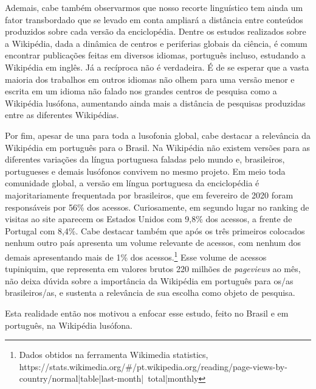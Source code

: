 Ademais, cabe também observarmos que nosso recorte linguístico tem ainda um fator transbordado que se levado em conta ampliará a distância entre conteúdos produzidos sobre cada versão da enciclopédia. Dentre os estudos realizados sobre a Wikipédia, dada a dinâmica de centros e periferias globais da ciência, é comum encontrar publicações feitas em diversos idiomas, português incluso, estudando a Wikipédia em inglês. Já a recíproca não é verdadeira. É de se esperar que a vasta maioria dos trabalhos em outros idiomas não olhem para uma versão menor e escrita em um idioma não falado nos grandes centros de pesquisa como a Wikipédia lusófona, aumentando ainda mais a distância de pesquisas produzidas entre as diferentes Wikipédias.

Por fim, apesar de una para toda a lusofonia global, cabe destacar a relevância da Wikipédia em português para o Brasil. Na Wikipédia não existem versões para as diferentes variações da língua portuguesa faladas pelo mundo e, brasileiros, portugueses e demais lusófonos convivem no mesmo projeto. Em meio toda comunidade global, a versão em língua portuguesa da enciclopédia é majoritariamente frequentada por brasileiros, que em fevereiro de 2020 foram responsáveis por 56\% dos acessos. Curiosamente, em segundo lugar no ranking de visitas ao site aparecem os Estados Unidos com 9,8\% dos acessos, a frente de Portugal com 8,4\%. Cabe destacar também que após os três primeiros colocados nenhum outro país apresenta um volume relevante de acessos, com nenhum dos demais apresentando mais de 1\% dos acessos.\footnote{Dados obtidos na ferramenta Wikimedia statistics, https://stats.wikimedia.org/\#/pt.wikipedia.org/reading/page-views-by-country/normal|table|last-month|~total|monthly} Esse volume de acessos tupiniquim, que representa em valores brutos 220 milhões de \textit{pageviews} ao mês, não deixa dúvida sobre a importância da Wikipédia em português para os/as brasileiros/as, e sustenta a relevância de sua escolha como objeto de pesquisa.

Esta realidade então nos motivou a enfocar esse estudo, feito no Brasil e em português, na Wikipédia lusófona.
